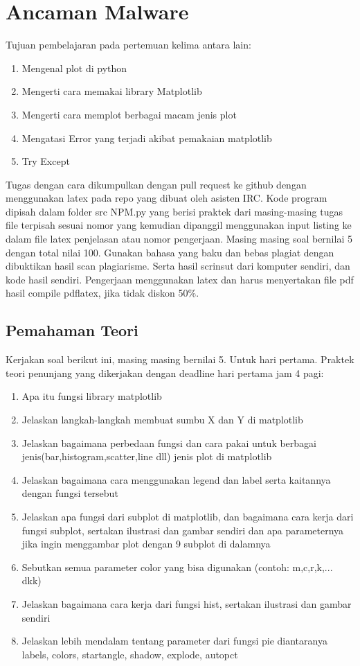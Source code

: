\chapter{Ancaman Malware}

Tujuan pembelajaran pada pertemuan kelima antara lain:
\begin{enumerate}
\item
Mengenal plot di python
\item
Mengerti cara memakai library Matplotlib
\item
Mengerti cara memplot berbagai macam jenis plot
\item
Mengatasi Error yang terjadi akibat pemakaian matplotlib
\item
Try Except
\end{enumerate}
Tugas dengan cara dikumpulkan dengan pull request ke github dengan menggunakan latex pada repo yang dibuat oleh asisten IRC. Kode program dipisah dalam folder src NPM.py yang berisi praktek dari masing-masing tugas file terpisah sesuai nomor yang kemudian dipanggil menggunakan input listing ke dalam file latex penjelasan atau nomor pengerjaan. Masing masing soal bernilai 5 dengan total nilai 100. Gunakan bahasa yang baku dan bebas plagiat dengan dibuktikan hasil scan plagiarisme. Serta hasil scrinsut dari komputer sendiri, dan kode hasil sendiri. Pengerjaan menggunakan latex dan harus menyertakan file pdf hasil compile pdflatex, jika tidak diskon 50\%.


\section{Pemahaman Teori}
Kerjakan soal berikut ini, masing masing bernilai 5. Untuk hari pertama.
Praktek teori penunjang yang dikerjakan dengan deadline hari pertama jam 4 pagi:
\begin{enumerate}
\item
Apa itu fungsi library matplotlib
\item
Jelaskan langkah-langkah membuat sumbu X dan Y di matplotlib
\item
Jelaskan bagaimana perbedaan fungsi dan cara pakai untuk berbagai jenis(bar,histogram,scatter,line dll) jenis plot di matplotlib
\item
Jelaskan bagaimana cara menggunakan legend dan label serta kaitannya dengan fungsi tersebut
\item
Jelaskan apa fungsi dari subplot di matplotlib, dan bagaimana cara kerja dari fungsi subplot, sertakan ilustrasi dan gambar sendiri dan apa parameternya jika ingin menggambar plot dengan 9 subplot di dalamnya
\item
Sebutkan semua parameter color yang bisa digunakan (contoh: m,c,r,k,... dkk)
\item
Jelaskan bagaimana cara kerja dari fungsi hist, sertakan ilustrasi dan gambar sendiri
\item
Jelaskan lebih mendalam tentang parameter dari fungsi pie diantaranya labels, colors, startangle, shadow, explode, autopct
\end{enumerate}

